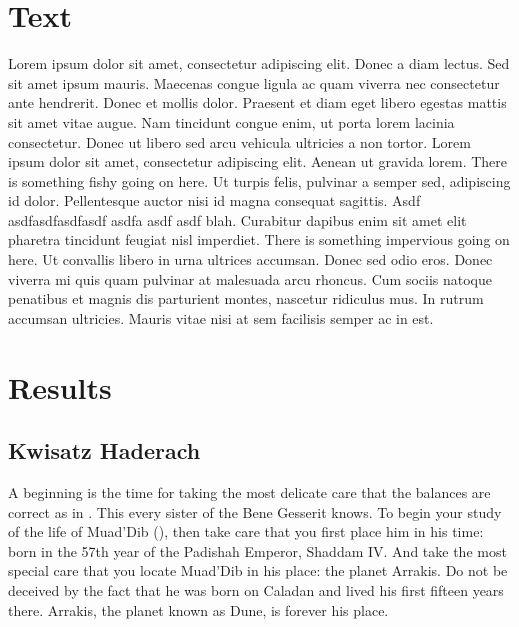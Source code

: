 
\section*{Text}

Lorem ipsum dolor sit amet, consectetur adipiscing elit. Donec a diam lectus. Sed sit amet ipsum mauris. Maecenas
congue ligula ac quam viverra nec consectetur ante hendrerit. Donec et mollis dolor. Praesent et diam eget libero
egestas mattis sit amet vitae augue. Nam tincidunt congue enim, ut porta lorem lacinia consectetur\cite{OKeeNade78a}.
Donec ut libero sed arcu vehicula ultricies a non tortor. Lorem ipsum dolor sit amet, consectetur adipiscing elit.
Aenean ut gravida lorem. There is something fishy going on here. Ut turpis felis, pulvinar a semper sed, adipiscing id
dolor. Pellentesque auctor nisi id magna consequat sagittis. Asdf asdfasdfasdfasdf asdfa asdf asdf blah. Curabitur
dapibus enim sit amet elit pharetra tincidunt feugiat nisl imperdiet. There is something impervious going on here. Ut
convallis libero in urna ultrices accumsan. Donec sed odio eros. Donec viverra mi quis quam pulvinar at malesuada arcu
rhoncus. Cum sociis natoque penatibus et magnis dis parturient montes, nascetur ridiculus mus. In rutrum accumsan
ultricies. Mauris vitae nisi at sem facilisis semper ac in est.

\section*{Results}

\subsection*{Kwisatz Haderach}

A beginning is the time for taking the most delicate care that the balances are correct as in . This every
sister of the Bene Gesserit knows.  To begin your study of the life
of Muad'Dib (), then take care that you first place him in his time: born in the 57th year of the
Padishah Emperor, Shaddam IV. And take the most special care that you locate Muad'Dib in his place: the planet Arrakis.
Do not be deceived by the fact that he was born on Caladan and lived his first fifteen years there. Arrakis, the planet
known as Dune, is forever his place.


